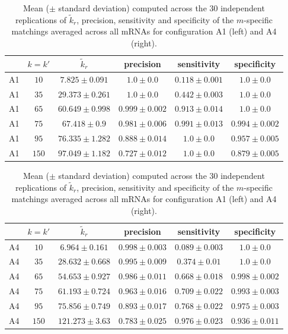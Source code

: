 \begin{table}
\space{3cm}
    \begin{minipage}{.5\linewidth}
    \tiny{
      \centering
 \begin{tabular}{c|c|c|c|c|c}
	 & $k=k'$ & $\tilde{k}_r$ & precision & sensitivity & specificity\\
	\hline
A1 &$ 10 $&$ 7.825 \pm 0.091 $&$ 1.0 \pm 0.0 $&$ 0.118 \pm 0.001 $&$ 1.0 \pm 0.0 $\\
A1  &$ 35 $&$ 29.373 \pm 0.261 $&$ 1.0 \pm 0.0 $&$ 0.442 \pm 0.003 $&$ 1.0 \pm 0.0 $\\
A1 &$ 65 $&$ 60.649 \pm 0.998 $&$ 0.999 \pm 0.002 $&$ 0.913 \pm 0.014 $&$ 1.0 \pm 0.0 $\\
A1  &$ 75 $&$  67.418 \pm 0.9 $&$ 0.981 \pm 0.006 $&$ 0.991 \pm 0.013 $&$ 0.994 \pm 0.002 $\\
A1 &$ 95 $&$ 76.335 \pm 1.282 $&$ 0.888 \pm 0.014 $&$ 1.0 \pm 0.0 $&$ 0.957 \pm 0.005 $\\
A1 &$ 150 $&$ 97.049 \pm 1.182 $&$ 0.727 \pm 0.012 $&$ 1.0 \pm 0.0 $&$ 0.879 \pm 0.005 $\\	\hline
		\end{tabular}     
		}
    \end{minipage}%
    \begin{minipage}{.5\linewidth}
    \tiny{
      \centering

\begin{tabular}{c|c|c|c|c|c}
 & $k=k'$ & $\tilde{k}_r$ & precision & sensitivity & specificity\\
\hline
A4 &$ 10 $&$ 6.964 \pm 0.161 $&$ 0.998 \pm 0.003 $&$ 0.089 \pm 0.003 $&$ 1.0 \pm 0.0 $\\
A4  &$ 35 $&$ 28.632 \pm 0.668 $&$ 0.995 \pm 0.009 $&$ 0.374 \pm 0.01 $&$ 1.0 \pm 0.0 $\\
 A4  &$ 65 $&$ 54.653 \pm 0.927 $&$ 0.986 \pm 0.011 $&$ 0.668 \pm 0.018 $&$ 0.998 \pm 0.002 $\\
A4 &$ 75 $&$ 61.193 \pm 0.724 $&$ 0.963 \pm 0.016 $&$ 0.709 \pm 0.022 $&$ 0.993 \pm 0.003 $\\
A4 &$ 95 $&$  75.856 \pm 0.749 $&$ 0.893 \pm 0.017 $&$ 0.768 \pm 0.022 $&$ 0.975 \pm 0.003 $\\
A4 &$ 150 $&$ 121.273 \pm 3.63 $&$ 0.783 \pm 0.025 $&$ 0.976 \pm 0.023 $&$ 0.936 \pm 0.011 $\\
\hline
\end{tabular}
}
    \end{minipage} 
\caption{Mean ($\pm$  standard deviation)  computed across the  30 independent
  replications of  $\tilde{k}_{r}$, precision, sensitivity and  specificity of
  the $m$-specific  matchings averaged across  all mRNAs for  configuration A1
  (left) and A4 (right).  \label{tab:simulA14:results:matching}}
  

\end{table}
